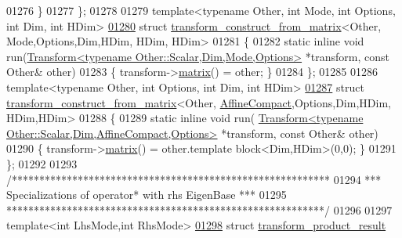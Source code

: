 \begin{DoxyCode}
01276   \}
01277 \};
01278 
01279 \textcolor{keyword}{template}<\textcolor{keyword}{typename} Other, \textcolor{keywordtype}{int} Mode, \textcolor{keywordtype}{int} Options, \textcolor{keywordtype}{int} Dim, \textcolor{keywordtype}{int} HDim>
\hyperlink{struct_eigen_1_1internal_1_1transform__construct__from__matrix_3_01_other_00_01_mode_00_01_optioafd8e88ef382fcf70f7e3dd5fcd9f415}{01280} \textcolor{keyword}{struct }\hyperlink{struct_eigen_1_1internal_1_1transform__construct__from__matrix}{transform\_construct\_from\_matrix}<Other, Mode,Options,Dim,HDim, HDim,
      HDim>
01281 \{
01282   \textcolor{keyword}{static} \textcolor{keyword}{inline} \textcolor{keywordtype}{void} run(\hyperlink{group___geometry___module_class_eigen_1_1_transform}{Transform<typename Other::Scalar,Dim,Mode,Options>}
       *transform, \textcolor{keyword}{const} Other& other)
01283   \{ transform->\hyperlink{group___geometry___module_aec8168000a88a807130d41020af98d47}{matrix}() = other; \}
01284 \};
01285 
01286 \textcolor{keyword}{template}<\textcolor{keyword}{typename} Other, \textcolor{keywordtype}{int} Options, \textcolor{keywordtype}{int} Dim, \textcolor{keywordtype}{int} HDim>
\hyperlink{struct_eigen_1_1internal_1_1transform__construct__from__matrix_3_01_other_00_01_affine_compact_0db5fc8047dca3fa661370cba4245d7ad}{01287} \textcolor{keyword}{struct }\hyperlink{struct_eigen_1_1internal_1_1transform__construct__from__matrix}{transform\_construct\_from\_matrix}<Other, 
      \hyperlink{group__enums_ggaee59a86102f150923b0cac6d4ff05107aa30a06b60d218b709020972df47de2b0}{AffineCompact},Options,Dim,HDim, HDim,HDim>
01288 \{
01289   \textcolor{keyword}{static} \textcolor{keyword}{inline} \textcolor{keywordtype}{void} run(
      \hyperlink{group___geometry___module_class_eigen_1_1_transform}{Transform<typename Other::Scalar,Dim,AffineCompact,Options>}
       *transform, \textcolor{keyword}{const} Other& other)
01290   \{ transform->\hyperlink{group___geometry___module_aec8168000a88a807130d41020af98d47}{matrix}() = other.template block<Dim,HDim>(0,0); \}
01291 \};
01292 
01293 \textcolor{comment}{/**********************************************************}
01294 \textcolor{comment}{***   Specializations of operator* with rhs EigenBase   ***}
01295 \textcolor{comment}{**********************************************************/}
01296 
01297 \textcolor{keyword}{template}<\textcolor{keywordtype}{int} LhsMode,\textcolor{keywordtype}{int} RhsMode>
\hyperlink{struct_eigen_1_1internal_1_1transform__product__result}{01298} \textcolor{keyword}{struct }\hyperlink{struct_eigen_1_1internal_1_1transform__product__result}{transform\_product\_result}

\end{DoxyCode}
